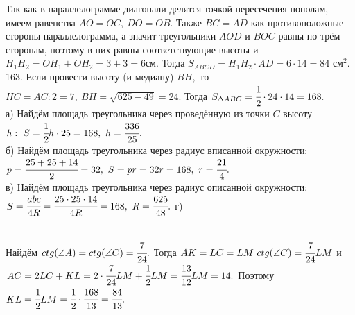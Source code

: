 \documentclass[12pt]{article}
\begin{document}
Так как в параллелограмме диагонали делятся точкой пересечения пополам, имеем равенства $AO=OC,\ DO=OB.$ Также $BC=AD$ как противоположные стороны параллелограмма, а значит треугольники $AOD$ и $BOC$ равны по трём сторонам, поэтому в них равны соответствующие высоты и $H_1H_2=OH_1+OH_2=3+3=6$см. Тогда $S_{ABCD}=H_1H_2\cdot AD=6\cdot14=84\text{ см}^2.$
163. Если провести высоту (и медиану) $BH,$ то $HC=AC:2=7,\ BH=\sqrt{625-49}=24.$ Тогда $S_{\Delta ABC}=\cfrac{1}{2}\cdot24\cdot14=168.$\\
а) Найдём площадь треугольника через проведённую из точки $C$ высоту $h:\ S=\cfrac{1}{2}h\cdot25=168,\ h=\cfrac{336}{25}.$\\
б) Найдём площадь треугольника через радиус вписанной окружности: $p=\cfrac{25+25+14}{2}=32,\ S=pr=32r=168,\ r=\cfrac{21}{4}.$\\
в) Найдём площадь треугольника через радиус описанной окружности: $S=\cfrac{abc}{4R}=\cfrac{25\cdot25\cdot14}{4R}=168,\ R=\cfrac{625}{48}.$\newpage\noindent
г) \begin{figure}[ht!]
\end{figure}\\
Найдём $ctg(\angle A)=ctg(\angle C)=\cfrac{7}{24}.$ Тогда $AK=LC=LM\ ctg(\angle C)=\cfrac{7}{24}LM$ и $AC=2LC+KL=2\cdot\cfrac{7}{24}LM+\cfrac{1}{2}LM=\cfrac{13}{12}LM=14.$ Поэтому $KL=\cfrac{1}{2}LM=\cfrac{1}{2}\cdot\cfrac{168}{13}=\cfrac{84}{13}.$\\
\end{document}

